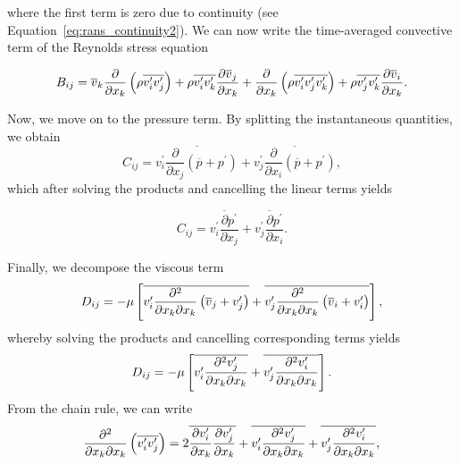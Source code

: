where the first term is zero due to continuity (see Equation~\ref{eq:rans_continuity2}). We can now write the time-averaged convective term of the Reynolds stress equation
\begin{eqBox}
\begin{equation}
	B_{ij} = 
	\overline v_k \frac{\partial}{\partial x_k} \left(\rho \overline{v_i^\prime v_j^\prime}\right) 
	+ \rho \overline{v_i^\prime v_k^\prime}\frac{\partial \overline v_j }{\partial x_k}
	+ \frac{\partial}{\partial x_k} \left(\rho \overline{v_i^\prime v_j^\prime v_k^\prime }\right)
	+ \rho \overline{v_j^\prime v_k^\prime}\frac{\partial \overline v_{i\vphantom{j}}}{\partial x_k}.
\end{equation}
\end{eqBox}
Now, we move on to the pressure term. By splitting the instantaneous quantities, we obtain
\begin{equation}
	C_{ij} = 
	\overline{v_i^\prime \frac{\partial}{\partial x_j} \left(\overline p + p^\prime \right)}
	+ \overline{v_j^\prime \frac{\partial}{\partial x_i} \left(\overline p + p^\prime\right)},
\end{equation}
which after solving the products and cancelling the linear terms yields
\begin{eqBox}
\begin{equation}
	C_{ij} =  
	\overline{v_i^\prime \frac{\partial p^\prime}{\partial x_j}}
	+\overline{v_j^\prime \frac{\partial p^\prime}{\partial x_i}}.
\end{equation}
\end{eqBox}
Finally, we decompose the viscous term
\begin{equation}
	D_{ij} = -\mu \left[ 
	  \overline{v_i^\prime \frac{\partial^2}{\partial x_k\partial x_k} \left(\overline v_j + v_j^\prime\right)}
	+ \overline{v_j^\prime \frac{\partial^2}{\partial x_k\partial x_k} \left(\overline v_i + v_{i\vphantom{j}}^\prime\right)}
	\right],
\end{equation}
whereby solving the products and cancelling corresponding terms yields
\begin{equation}
	D_{ij} = -\mu \left[ 
	  \overline{v_i^\prime \frac{\partial^2 v_j^\prime}{\partial x_k\partial x_k}}
	+ \overline{v_j^\prime \frac{\partial^2 v_{i\vphantom{j}}^\prime }{\partial x_k\partial x_k}}
	\right].
\end{equation}
From the chain rule, we can write
\begin{equation}
	\frac{\partial^2}{\partial x_k \partial x_k} \left(\overline{v_i^\prime v_j^\prime} \right) 
	= 2\overline{\frac{\partial v_{i\vphantom{j}}^\prime}{\partial x_k}\frac{\partial v_j^\prime}{\partial x_k}}
	+ \overline{v_i^\prime \frac{\partial^2 v_j^\prime}{\partial x_k\partial x_k}}
	+ \overline{v_j^\prime \frac{\partial^2 v_{i\vphantom{j}}^\prime}{\partial x_k\partial x_k}},
\end{equation}
